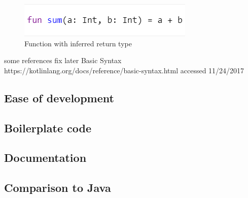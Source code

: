  
 \begin{figure}
 \centering
 \includegraphics[scale=1]{figs/InferredReturnType.png}
 \caption{Function with inferred return type}
 \label{fig:inferred return type}
\end{figure}
 
some references fix later
Basic Syntax
https://kotlinlang.org/docs/reference/basic-syntax.html
accessed 11/24/2017

\subsection{Ease of development}

\subsection{Boilerplate code}

\subsection{Documentation}

\subsection{Comparison to Java}


